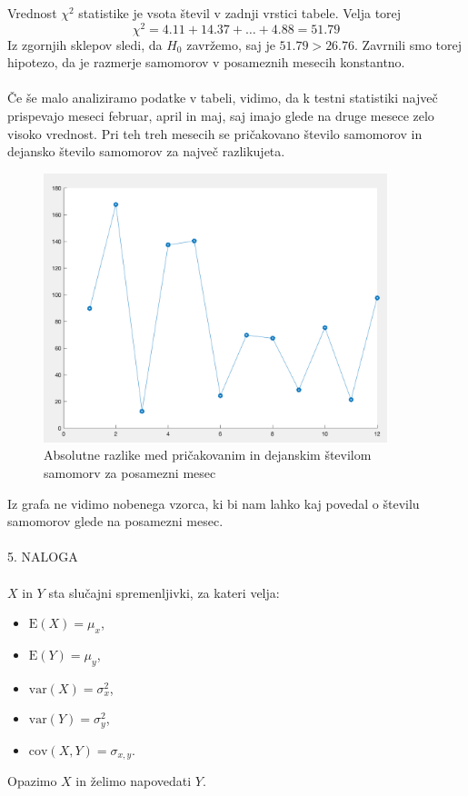 \documentclass[a4paper,12pt]{article}
\begin{document}
\noindent
Vrednost $\chi^2$ statistike je vsota števil v zadnji vrstici tabele. Velja torej
$$ \chi^2 = 4.11 + 14.37 + \ldots + 4.88 = 51.79 $$
Iz zgornjih sklepov sledi, da $H_0$ zavržemo, saj je $51.79 > 26.76$. Zavrnili smo torej hipotezo, da je razmerje samomorov v posameznih mesecih konstantno.
\\
\\
Če še malo analiziramo podatke v tabeli, vidimo, da k testni statistiki največ prispevajo meseci februar, april in maj, saj imajo glede na druge mesece zelo visoko vrednost. Pri teh treh mesecih se pričakovano število samomorov in dejansko število samomorov za največ razlikujeta.
\\
\begin{figure}[ht!]
    \centering
    \includegraphics[width=100mm]{razp.png}
    \caption{Absolutne razlike med pričakovanim in dejanskim številom samomorv za posamezni mesec}
\end{figure}

\noindent
Iz grafa ne vidimo nobenega vzorca, ki bi nam lahko kaj povedal o številu samomorov glede na posamezni mesec.
\\
\\
\noindent
\textsc{\large{5. NALOGA}}
\\
\\
$X$ in $Y$ sta slučajni spremenljivki, za kateri velja:
\begin{itemize} 
    \item $\text{E}(X) = \mu_x$,
    \item $\text{E}(Y) = \mu_y$,
    \item $\text{var}(X) = \sigma_x^2$,
    \item $\text{var}(Y) = \sigma_y^2$,
    \item $\text{cov}(X,Y) = \sigma_{x,y}$.
\end{itemize}
Opazimo $X$ in želimo napovedati $Y$. 
\\
\end{document}
